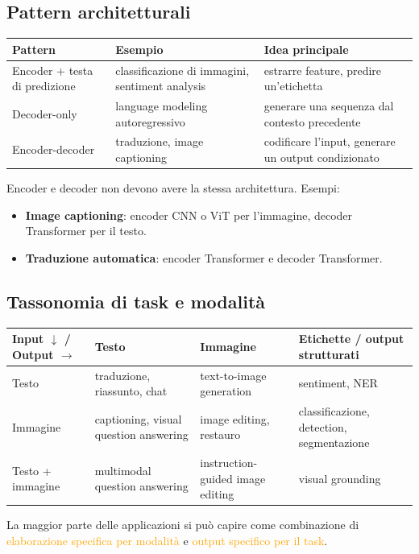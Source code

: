 \documentclass[a4paper,12pt]{article}
\newcommand{\hl}[1]{\textcolor{orange}{#1}}
\begin{document}
\subsection{Pattern architetturali}
\begin{center}
\begin{tabular}{p{3.4cm} p{4.6cm} p{6.4cm}}
\textbf{Pattern} & \textbf{Esempio} & \textbf{Idea principale}\\
\hline
Encoder + testa di predizione & classificazione di immagini, sentiment analysis & estrarre feature, predire un'etichetta\\
Decoder-only & language modeling autoregressivo & generare una sequenza dal contesto precedente\\
Encoder-decoder & traduzione, image captioning & codificare l'input, generare un output condizionato\\
\end{tabular}
\end{center}
Encoder e decoder non devono avere la stessa architettura. Esempi:
\begin{itemize}
\item \textbf{Image captioning}: encoder CNN o ViT per l'immagine, decoder Transformer per il testo.
\item \textbf{Traduzione automatica}: encoder Transformer e decoder Transformer.
\end{itemize}

\subsection{Tassonomia di task e modalità}
\begin{center}
\small
\begin{tabular}{p{3.4cm} p{4.0cm} p{4.0cm} p{4.6cm}}
\textbf{Input $\downarrow$ / Output $\rightarrow$} & \textbf{Testo} & \textbf{Immagine} & \textbf{Etichette / output strutturati}\\
\hline
Testo & traduzione, riassunto, chat & text-to-image generation & sentiment, NER\\
Immagine & captioning, visual question answering & image editing, restauro & classificazione, detection, segmentazione\\
Testo + immagine & multimodal question answering & instruction-guided image editing & visual grounding\\
\end{tabular}
\end{center}
La maggior parte delle applicazioni si può capire come combinazione di \hl{elaborazione specifica per modalità} e \hl{output specifico per il task}.
\end{document}
